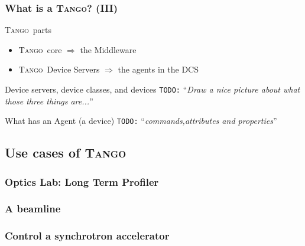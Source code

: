 \documentclass{beamer}
\newcommand{\tango}{\textsc{Tango}}
\newcommand{\onmiORB}{\textsc{omniORB}}
\newcommand{\zmq}{\textsc{$\varnothing$mq}}
\newcommand{\mysql}{\textsc{MySQL}}
\newcommand{\sardana}{\textsc{Sardana}}
\newcommand{\atk}{\textsc{Atk}}
\newcommand{\taurus}{\textsc{Taurus}}
\newcommand{\todo}[1]{\texttt{\color{red}TODO:} ``\emph{#1}''}
\begin{document}
\begin{frame}
\frametitle{What is a \tango? (III)}
    \begin{block}{\tango\, parts}
        \begin{itemize}
            \item \tango\, core $\Rightarrow$ the Middleware
            \item \tango\, Device Servers $\Rightarrow$ the agents in the DCS
        \end{itemize}
    \end{block}
    \begin{exampleblock}{Device servers, device classes, and devices}
        \todo{Draw a nice picture about what those three things are...}
    \end{exampleblock}
    \begin{block}{What has an Agent (a device)}
        \todo{commands,attributes and properties}
    \end{block}
\end{frame}

\subsection{Use cases of \tango}

\begin{frame}
\frametitle{Optics Lab: Long Term Profiler}
\end{frame}

\begin{frame}
\frametitle{A beamline}
\end{frame}

\begin{frame}
\frametitle{Control a synchrotron accelerator}
\end{frame}
\end{document}
